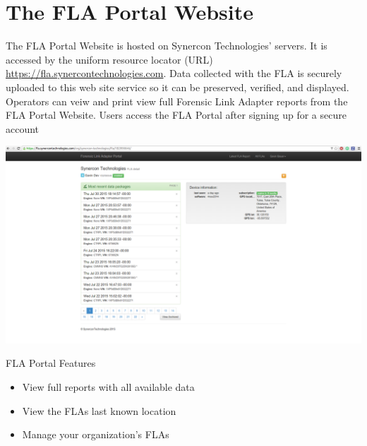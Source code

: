 \documentclass[11pt, oneside]{book}
\begin{document}
\section{The FLA Portal Website}
\vspace{1cm}
The FLA Portal Website is hosted on Synercon Technologies' servers. It is accessed by the uniform resource locator (URL)  \url{https://fla.synercontechnologies.com}.
Data collected with the FLA is securely uploaded to this web site service so it can be preserved, verified, and displayed. Operators can veiw and print
view full Forensic  Link Adapter reports from the FLA Portal Website. Users access the FLA Portal after signing up for a secure account 
\vspace{1cm}
\begin{center}
\includegraphics[width=.9\linewidth]{../media/fla_portal_screenshots/user_landing_page}
\end{center}
\vspace{1cm}
FLA Portal Features
\begin{itemize}
\item View full reports with all available data
\item View the FLAs last known location
\item Manage your organization's FLAs
\end{itemize}
\newpage
\end{document}
